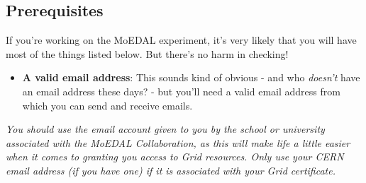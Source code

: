 \subsection{Prerequisites}
\label{sec:prerequisites}
If you're working on the \ac{MoEDAL} experiment,
it's very likely that you will have most of the things listed below.
But there's no harm in checking!

\begin{itemize}
\tightlist
\item
  \textbf{A valid email address}: This sounds kind of obvious - and who
  \emph{doesn't} have an email address these days? - but you'll need a
  valid email address from which you can send and receive emails.
\end{itemize}

\begin{tcolorbox}[title=Institutional email accounts]
\emph{You should use the email account
given to you by the school or university associated with the
\ac{MoEDAL} Collaboration, as this
will make life a little easier when it comes to granting you access to
Grid resources. Only use your \acs{CERN} email address (if you have one)
if it is associated with your Grid certificate.}
\end{tcolorbox}

